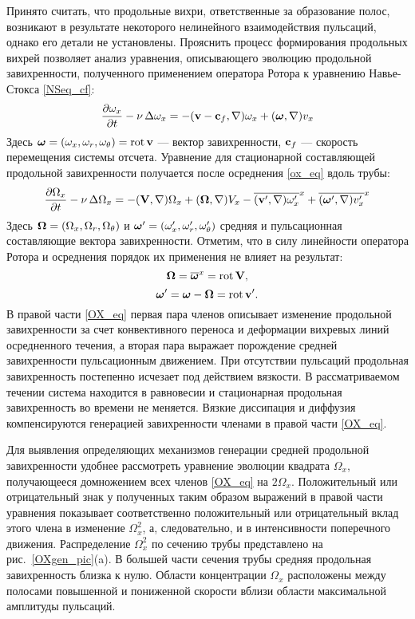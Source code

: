 Принято считать, что продольные вихри, ответственные за образование полос, возникают в результате некоторого нелинейного взаимодействия пульсаций, однако его детали не установлены. Прояснить процесс формирования продольных вихрей позволяет анализ уравнения, описывающего эволюцию продольной завихренности, полученного применением оператора Ротора к уравнению Навье-Стокса \eqref{NSeq_cf}:
\begin{equation}\label{ox_eq}
\frac{\partial \omega_x}{\partial t} - \nu\mathop{}\!\Delta \omega_x =  -  (\mathbf{v} - \mathbf{c}_f, \nabla) \omega_x + (\mbox{\boldmath$\omega$}, \nabla) v_x
\end{equation}
Здесь $\mbox{\boldmath$\omega$} = (\omega_x, \omega_r, \omega_\theta) = \mathop{}\!\operatorname{rot} \mathbf{v}$ --- вектор завихренности, $\mathbf{c}_f$ --- скорость перемещения системы отсчета. Уравнение для стационарной составляющей продольной завихренности получается после осреднения \eqref{ox_eq} вдоль трубы:
\begin{equation}\label{OX_eq}
\frac{\partial \Omega_x}{\partial t} - \nu\mathop{}\!\Delta \Omega_x = - (\mathbf{V}, \nabla) \Omega_x + (\mbox{\boldmath$\Omega$}, \nabla) V_x - \overline{(\mathbf{v}', \nabla) \omega'_x}^x + \overline{ (\mbox{\boldmath$\omega$}', \nabla) v'_x }^x
\end{equation}
Здесь  $\mbox{\boldmath$\Omega$}=(\Omega_x, \Omega_r, \Omega_\theta)$ и $\mbox{\boldmath$\omega$}'=(\omega'_x, \omega'_r, \omega'_\theta)$ средняя и пульсационная составляющие вектора завихренности. Отметим, что в силу линейности оператора Ротора и осреднения порядок их применения не влияет на результат:
$$
\mbox{\boldmath$\Omega$} = \overline{\mbox{\boldmath$\omega$}}^x = \mathop{}\!\operatorname{rot} \mathbf{V},
$$ 
$$
\mbox{\boldmath$\omega$}' = \mbox{\boldmath$\omega$} - \mbox{\boldmath$\Omega$} = \mathop{}\!\operatorname{rot} \mathbf{v}'.
$$ 
В правой части \eqref{OX_eq} первая пара членов описывает изменение продольной завихренности за счет конвективного переноса и деформации вихревых линий осредненного течения, а вторая пара выражает порождение средней завихренности пульсационным движением. При отсутствии пульсаций продольная завихренность постепенно исчезает под действием вязкости. В рассматриваемом течении система находится в равновесии и стационарная продольная завихренность во времени не меняется. Вязкие диссипация и диффузия компенсируются генерацией завихренности членами в правой части \eqref{OX_eq}.

Для выявления определяющих механизмов генерации средней продольной завихренности удобнее рассмотреть уравнение эволюции квадрата $\Omega_x$, получающееся домножением всех членов \eqref{OX_eq} на $2\Omega_x$. Положительный или отрицательный знак у полученных таким образом выражений в правой части уравнения показывает соответственно положительный или отрицательный вклад этого члена в изменение $\Omega_x^2$, а, следовательно, и в интенсивности поперечного движения. Распределение $\Omega_x^2$ по сечению трубы представлено на рис.~\ref{OXgen_pic}(a). В большей части сечения трубы средняя продольная завихренность близка к нулю. Области концентрации $\Omega_x$ расположены между полосами повышенной и пониженной скорости вблизи области максимальной амплитуды пульсаций.

